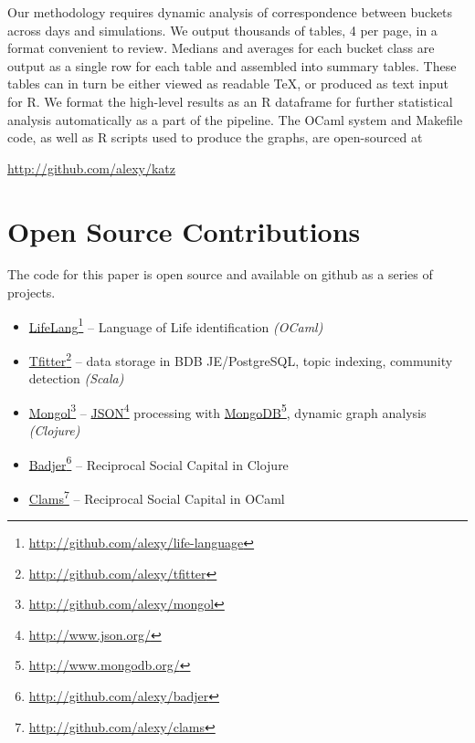 \documentclass[10pt,oneside]{memoir}
\begin{document}
\begin{Spacing}{2}
Our methodology requires dynamic analysis of correspondence between buckets across days and simulations.  We output thousands of tables, 4 per page, in a format convenient to review.  Medians and averages for each bucket class are output as a single row for each table and assembled into summary tables.  These tables can in turn be either viewed as readable {\TeX}, or produced as text input for R.  We format the high-level results as an R dataframe for further statistical analysis automatically as a part of the pipeline.  The OCaml system and Makefile code, as well as R scripts used to produce the graphs, are open-sourced at


\url{http://github.com/alexy/katz}


\section{Open Source Contributions}
\label{opensourcecontributions}

The code for this paper is open source and available on github as a series of projects.


\begin{itemize}


\item \href{http://github.com/alexy/life-language}{LifeLang}\footnote{\href{http://github.com/alexy/life-language}{http://github.com/alexy/life-language}} -- Language of Life identification {\itshape (OCaml)}

\item \href{http://github.com/alexy/tfitter}{Tfitter}\footnote{\href{http://github.com/alexy/tfitter}{http://github.com/alexy/tfitter}} \cite{code:tfitter} -- data storage in BDB JE/PostgreSQL, topic indexing, community detection {\itshape (Scala)}

\item \href{http://github.com/alexy/mongol}{Mongol}\footnote{\href{http://github.com/alexy/mongol}{http://github.com/alexy/mongol}} -- \href{http://www.json.org/}{JSON}\footnote{\href{http://www.json.org/}{http://www.json.org/}} processing with \href{http://www.mongodb.org/}{MongoDB}\footnote{\href{http://www.mongodb.org/}{http://www.mongodb.org/}}, dynamic graph analysis {\itshape (Clojure)}

\item \href{http://github.com/alexy/badjer}{Badjer}\footnote{\href{http://github.com/alexy/badjer}{http://github.com/alexy/badjer}} -- Reciprocal Social Capital in Clojure

\item \href{http://github.com/alexy/clams}{Clams}\footnote{\href{http://github.com/alexy/clams}{http://github.com/alexy/clams}} -- Reciprocal Social Capital in OCaml


\end{itemize}
\end{Spacing}
\end{document}
